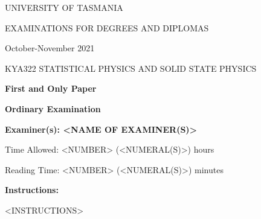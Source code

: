 \documentclass[12pt,a4paper]{article}
\begin{document}


	\pagestyle{fancy}
	\lfoot{}
	\cfoot{}
	\rfoot{}

	\bigskip

	\begin{center}
		UNIVERSITY OF TASMANIA

		\vspace{2.0cm}

		EXAMINATIONS FOR DEGREES AND DIPLOMAS

		\vspace{0.5cm}

		October-November 2021

		\vspace{2.0cm}

		\noindent
		\parbox[t]{14cm}{\centering
			{\Large
				KYA322 STATISTICAL PHYSICS AND SOLID STATE PHYSICS \\	}}

		\vspace{1cm}

		\textbf{First and Only Paper}
		\vspace{0.5cm}

		\textbf{Ordinary Examination}
	\end{center}

	\vspace{0.5cm}

	\begin{center}
		\noindent
		\parbox[t] {10.0cm}{\centering
		\textbf{Examiner(s):  <NAME OF EXAMINER(S)>}

		\vspace{1.0cm}

		Time Allowed: <NUMBER> (<NUMERAL(S)>) hours

		Reading Time: <NUMBER> (<NUMERAL(S)>) minutes}

	\end{center}

	\vspace{1.0cm}

	\textbf{Instructions: \\ }
	\begin{center}
		\vspace{-0.75cm}
		\parbox[h]{14.0cm}{

			<INSTRUCTIONS>


		}
		\vspace{1cm}
	\end{center}
	\break
\end{document}
